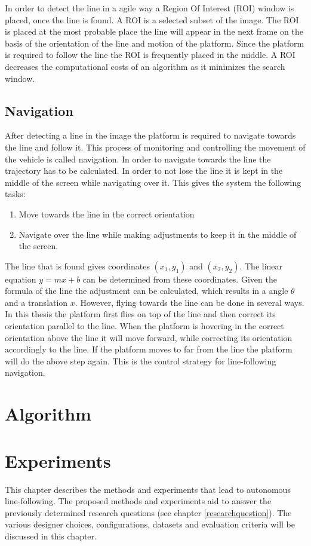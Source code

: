 \documentclass[a4paper]{article}
\begin{document}
In order to detect the line in a agile way a Region Of Interest (ROI) window is placed, once the line is found. A ROI is a selected subset of the image. The ROI is placed at the most probable place the line will appear in the next frame on the basis of the orientation of the line and motion of the platform. Since the platform is required to follow the line the ROI is frequently placed in the middle. A ROI decreases the computational costs of an algorithm as it minimizes the search window.

\subsection{Navigation}
After detecting a line in the image the platform is required to navigate towards the line and follow it. This process of monitoring and controlling the movement of the vehicle is called navigation. In order to navigate towards the line the trajectory has to be calculated. In order to not lose the line it is kept in the middle of the screen while navigating over it. This gives the system the following tasks:
\begin{enumerate}
\item Move towards the line in the correct orientation
\item Navigate over the line while making adjustments to keep it in the middle of the screen.
\end{enumerate}

The line that is found gives coordinates $(x_1, y_1)$ and $(x_2, y_2)$. The linear equation $y = mx + b$ can be determined from these coordinates. Given the formula of the line the adjustment can be calculated, which results in a angle $\theta$ and a translation $x$. However, flying towards the line can be done in several ways. In this thesis the platform first flies on top of the line and then correct its orientation parallel to the line. When the platform is hovering in the correct orientation above the line it will move forward, while correcting its orientation accordingly to the line. If the platform moves to far from the line the platform will do the above step again. This is the control strategy for line-following navigation.

\newpage
\section{Algorithm}
\label{ALGORITHM}
\newpage
\section{Experiments}
\label{EXPERIMENTS}
This chapter describes the methods and experiments that lead to autonomous line-following. The proposed methods and experiments aid to answer the previously determined research questions (see chapter \ref{researchquestion}). The various designer choices, configurations, datasets and evaluation criteria will be discussed in this chapter.
\end{document}
